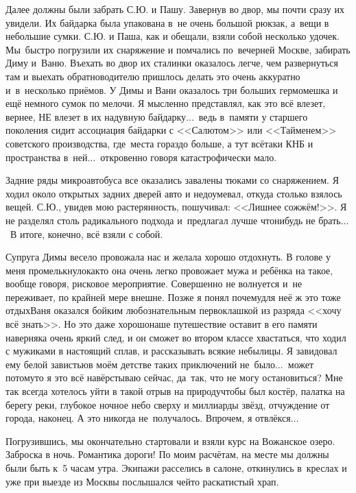 Далее должны были забрать С.Ю. и Пашу. Завернув во двор, мы почти сразу их увидели. Их байдарка была упакована в~не очень большой рюкзак, а~вещи в небольшие сумки. С.Ю. и Паша, как и обещали, взяли собой несколько удочек. Мы~быстро погрузили их снаряжение и помчались по~вечерней Москве, забирать Диму и~Ваню. Въехать во двор их сталинки оказалось легче, чем развернуться там и выехать обратно\mdash водителю пришлось делать это очень аккуратно и~в~несколько приёмов. У Димы и Вани оказалось три больших гермомешка и ещё немного сумок по мелочи. Я мысленно представлял, как это всё влезет, вернее, НЕ влезет в их надувную байдарку$\ldots$~ведь в~памяти у старшего поколения сидит ассоциация байдарки с <<Салютом>> или <<Тайменем>> советского производства, где~места гораздо больше, а тут всё\sdash таки КНБ и пространства в~ней$\ldots$~откровенно говоря катастрофически мало.

Задние ряды микроавтобуса все оказались завалены тюками со снаряжением. Я ходил около открытых задних дверей авто и недоумевал, откуда столько взялось вещей. С.Ю., увидев мою растерянность, пошучивал: <<Лишнее сожжём!>>. Я не разделял столь радикального подхода и~предлагал лучше что\sdash нибудь не брать$\ldots$~В итоге, конечно, всё взяли с собой.

Супруга Димы весело провожала нас и желала хорошо отдохнуть. В голове у меня промелькнуло\mdash как\sdash то она очень легко провожает мужа и ребёнка на такое, вообще говоря, рисковое мероприятие. Совершенно не волнуется и~не переживает, по крайней мере внешне. Позже я понял почему\mdash для неё ж это тоже отдых\mdash Ваня оказался бойким любознательным первоклашкой из разряда <<хочу всё знать>>. Но это даже хорошо\mdash наше путешествие оставит в его памяти наверняка очень яркий след, и он сможет во втором классе хвастаться, что ходил с мужиками в настоящий сплав, и рассказывать всякие небылицы. Я завидовал ему белой завистью\mdash в моём детстве таких приключений не~было$\ldots$~может потому\sdash то я это всё навёрстываю сейчас, да~так, что не могу остановиться? Мне так всегда хотелось уйти в такой отрыв на природу\mdash чтобы был костёр, палатка на берегу реки, глубокое ночное небо сверху и миллиарды звёзд, отчуждение от города, наконец. А это никогда не~получалось. Впрочем, я отвлёкся$\ldots$

Погрузившись, мы окончательно стартовали и взяли курс на Вожанское озеро. Заброска в ночь. Романтика дороги! По моим расчётам, на месте мы должны были быть к~5\thinspace\nbdash{} часам утра. Экипажи расселись в салоне, откинулись в~креслах и уже при выезде из Москвы послышался чей\sdash то раскатистый храп.

